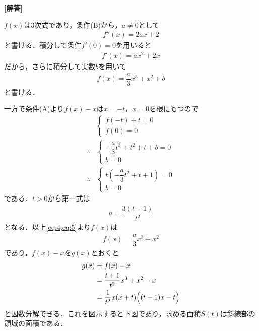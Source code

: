 \documentclass[../../main.tex]{subfiles}
\begin{document}
\begin{oframed}
  
\end{oframed}

{\bf [解答]}

$f(x)$は3次式であり，条件(B)から，$a\neq0$として
\begin{align}
  f''(x)=2ax+2 \label{eq:1}
\end{align}
と書ける．積分して条件$f'(0)=0$を用いると
\begin{align}
  f'(x)=ax^2+2x \label{eq:2}
\end{align}
だから，さらに積分して実数$b$を用いて
\begin{align}
  f(x)=\dfrac{a}{3}x^3+x^2+b \label{eq:3}
\end{align}
と書ける．

一方で条件(A)より$f(x)-x$は$x=-t$，$x=0$を根にもつので
\begin{align}
  &
  \begin{cases}
    f(-t)+t = 0 \\
    f(0) = 0
  \end{cases} \\
  \therefore
  &
  \begin{cases}
    -\dfrac{a}{3}t^3+t^2+t+b=0 \\
    b=0
  \end{cases} \\
  \therefore
  &
  \begin{cases}
    t\left(-\dfrac{a}{3}t^2+t+1\right) = 0 \\
    b=0
  \end{cases} \label{eq:4}
\end{align}
である．$t>0$から第一式は
\begin{align}
  a=\dfrac{3(t+1)}{t^2} \label{eq:5}
\end{align}
となる．以上\cref{eq:4,eq:5}より$f(x)$は
\begin{align}
  f(x) = \dfrac{a}{3}x^3+x^2 \label{eq:6}
\end{align}
であり，$f(x)-x$を$g(x)$とおくと
\begin{align}
  g(x)
  &=f(x)-x \\
  &=\dfrac{t+1}{t^2}x^3+x^2-x\\
  &=\dfrac{1}{t^2}x(x+t)\Bigl((t+1)x-t\Bigr)
\end{align}
と因数分解できる．これを図示すると下図であり，求める面積$S(t)$は斜線部の領域の面積である．
\end{document}
